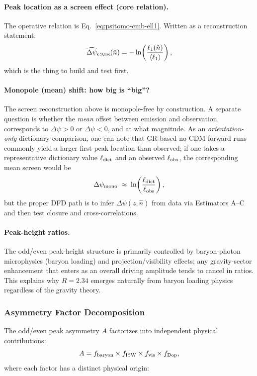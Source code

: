 \paragraph{Peak location as a screen effect (core relation).}
The operative relation is Eq.~\eqref{eq:psitomo-cmb-ell1}. Written as a reconstruction statement:
\begin{equation}
\widehat{\Delta\psi}_{\rm CMB}(\hat n)= -\ln\!\left(\frac{\ell_1(\hat n)}{\langle\ell_1\rangle}\right),
\end{equation}
which is the thing to build and test first.

\paragraph{Monopole (mean) shift: how big is ``big''?}
The screen reconstruction above is monopole-free by construction. A separate question is whether the \emph{mean} offset between emission and observation corresponds to $\Delta\psi>0$ or $\Delta\psi<0$, and at what magnitude. As an \emph{orientation-only} dictionary comparison, one can note that GR-based no-CDM forward runs commonly yield a larger first-peak location than observed; if one takes a representative dictionary value $\ell_{\rm dict}$ and an observed $\ell_{\rm obs}$, the corresponding mean screen would be
\begin{equation}
\Delta\psi_{\rm mono}\;\approx\;\ln\!\left(\frac{\ell_{\rm dict}}{\ell_{\rm obs}}\right),
\end{equation}
but the proper DFD path is to infer $\Delta\psi(z,\hat n)$ from data via Estimators A--C and then test closure and cross-correlations.

\paragraph{Peak-height ratios.}
The odd/even peak-height structure is primarily controlled by baryon-photon microphysics (baryon loading) and projection/visibility effects; any gravity-sector enhancement that enters as an overall driving amplitude tends to cancel in ratios. This explains why $R = 2.34$ emerges naturally from baryon loading physics regardless of the gravity theory.

\subsubsection{Asymmetry Factor Decomposition}

The odd/even peak asymmetry $A$ factorizes into independent physical contributions:
\begin{equation}\label{eq:asymmetry-decomposition}
A = f_{\rm baryon} \times f_{\rm ISW} \times f_{\rm vis} \times f_{\rm Dop},
\end{equation}
where each factor has a distinct physical origin:

